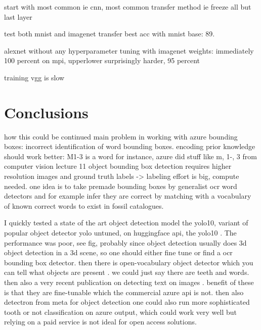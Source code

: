 \documentclass{article}
\begin{document}
start with most common ie cnn, most common transfer method ie freeze all but last layer 

test both mnist and imagenet transfer 
best acc with mnist base: 89.

alexnet without any hyperparameter tuning with imagenet weights: immediately 100 percent on mpi,
upperlower surprisingly harder, 95 percent

training vgg is slow

\section{Conclusions}

how this could be continued
main problem in working with azure bounding boxes: incorrect identification of word bounding boxes.
encoding prior knowledge should work better: M1-3 is a word for instance, azure did stuff like m, 1-, 3
from computer vision lecture 11 \cite{ruotsalainen2024}
object bounding box detection requires higher resolution images and ground truth labels -> labeling effort is 
big, compute needed. one idea is to take premade bounding boxes by generalist ocr word detectors and for example
infer they are correct by matching with a vocabulary of known correct words to exist in fossil catalogues.

I quickly tested a state of the art object detection model the yolo10, variant of popular object detector yolo\cite{redmonYouOnlyLook2016}
 untuned, on huggingface api, the yolo10 \cite{OmouredYOLOv10DocumentLayoutAnalysisHugging2023}. The performance 
was poor, see fig, probably since object detection usually does 3d object detection in a 3d scene, so one should either 
fine tune or find a ocr bounding box detector. then there is open-vocabulary object detector which you can tell what objects 
are present \cite{YOLOWorldRealTimeOpenVocabulary}. we could just say there are teeth and words. 
then also a very recent publication on detecting text on images \cite{longHierarchicalTextSpotter2024}.
benefit of these is that they are fine-tunable which the commercial azure api is not. 
then also detectron \cite{Detectron} from meta for object detection
one could also run more sophisticated 
tooth or not classification on azure output, which could work very well but relying on a paid service is not ideal 
for open access solutions.
\end{document}
